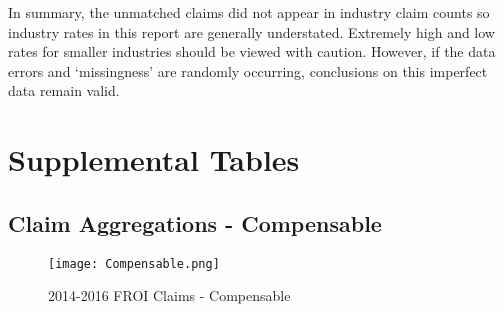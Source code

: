 \documentclass[9pt, oneside]{article}   	%
\begin{document}
In summary, the unmatched claims did not appear in industry claim counts so industry rates in this report are generally understated. Extremely high and low rates for smaller industries should be viewed with caution.  However, if the data errors and `missingness' are randomly occurring, conclusions on this imperfect data remain valid.

\pagebreak




\section{Supplemental Tables}




\subsection{Claim Aggregations - Compensable}

\setcounter{table}{0}
\renewcommand{\thetable}{C\arabic{table}}







\begin{figure}[h]
\caption{2014-2016 FROI Claims - Compensable}
\hspace{1.0in}

\label{Fig:AllClaims}
\begin{center}
\texttt{[image: Compensable.png]}
\end{center}
\end{figure}





\pagebreak
\end{document}

